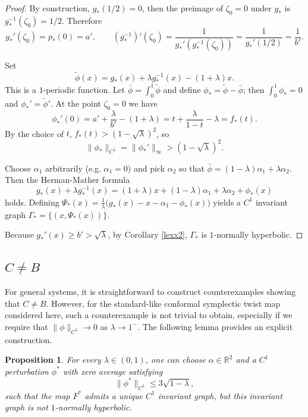 \documentclass{amsart}
\newtheorem{Proposition}[Definition]{Proposition}
\begin{document}
\begin{proof}
		
		By construction, \(g_*(1/2)=0\), then the preimage of $\zeta_0=0$ under \(g_*\) is
		\(g_*^{-1}(\zeta_0)=1/2\).  Therefore
		\[
		g_*'(\zeta_0)=p_*(0)=a',\qquad
		(g_*^{-1})'(\zeta_0) = \frac{1}{g_*'(g_*^{-1}(\zeta_0))} = \frac{1}{g_*'(1/2)} = \frac{1}{b'}.
		\]
		
		
		Set
		\[
		\widetilde\phi(x) = g_*(x) + \lambda g_*^{-1}(x) - (1+\lambda)x.
		\]
		This is a \(1\)-periodic function.  Let \(\bar\phi = \int_0^1 \widetilde\phi\)
		and define \(\phi_* = \widetilde\phi - \bar\phi\); then \(\int_0^1 \phi_*=0\) and
		\(\phi_*'=\widetilde\phi'\).
		At the point \(\zeta_0=0\) we have
		\[
		\phi_*'(0) = a' + \frac{\lambda}{b'} - (1+\lambda) = t + \frac{\lambda}{1-t} - \lambda = f_*(t).
		\]
		By the choice of \(t\), \(f_*(t) > (1-\sqrt{\lambda})^2\), so
		\[\|\phi_*\|_{C^1}= \|\phi_*'\|_\infty > (1-\sqrt{\lambda})^2.\]
		
		
		Choose \(\alpha_1\) arbitrarily (e.g. \(\alpha_1=0\)) and pick \(\alpha_2\) so that
		\(\bar\phi = (1-\lambda)\alpha_1 + \lambda\alpha_2\).  Then the Herman-Mather formula
		\[
		g_*(x) + \lambda g_*^{-1}(x) = (1+\lambda)x + (1-\lambda)\alpha_1 + \lambda\alpha_2 + \phi_*(x)
		\]
		holds.  Defining \(\Psi_*(x) = \frac{1}{\lambda}\bigl(g_*(x)-x-\alpha_1-\phi_*(x)\bigr)\)
		yields a \(C^1\) invariant graph \(\Gamma_*=\{(x,\Psi_*(x))\}\).
		
		
		Because \(g_*'(x)\ge b'>\sqrt{\lambda}\), by Corollary \ref{lexx2},  \(\Gamma_*\) is \(1\)-normally
		hyperbolic.
	\end{proof}
	\subsection{\(C \neq B\)}
	
	For general systems, it is straightforward to construct counterexamples showing that \(C \neq B\). However, for the standard-like conformal symplectic twist map considered here, such a counterexample is not trivial to obtain, especially if we require that \(\|\phi\|_{C^1} \to 0\) as \(\lambda \to 1^-\). The following lemma provides an explicit construction.
	
	\begin{Proposition}\label{lexx33}
		For every $\lambda\in(0,1)$, one can choose \(\alpha \in \mathbb{R}^2\) and a \(C^1\) perturbation \(\phi^*\) with zero average satisfying
		\begin{equation}\label{m22conx5}
			\|\phi^*\|_{C^1} \leq 3\sqrt{1-\lambda},
		\end{equation}
		such that the map \(F^*\) admits a unique \(C^1\) invariant graph, but this invariant graph is not \(1\)-normally hyperbolic.
	\end{Proposition}
	
\end{document}

